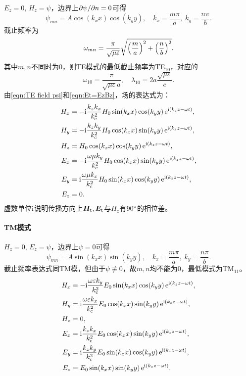 $E_z=0,\,H_z=\psi$，边界上$\partial\psi/\partial n=0$可得
\begin{equation}
    \psi_{mn}=A\cos(k_xx)\cos(k_yy),\quad k_x=\frac{m\pi}a,\;k_y=\frac{n\pi}b.
\end{equation}
截止频率为
\begin{equation}
    \omega_{mn}=\frac\pi{\sqrt{\mu\varepsilon}}\sqrt{\Bigl(\frac ma\Bigr)^2+\Bigl(\frac nb\Bigr)^2}.
\end{equation}
其中$m,n$不同时为0，则TE模式的最低截止频率为TE$_{10}$，对应的
\[
    \omega_{10}=\frac\pi{\sqrt{\mu\varepsilon}a},\quad\lambda_{10}=2a\frac{\sqrt{\mu\varepsilon}}c.
\]
由\eqref{eqn:TE field psi}和\eqref{eqn:Et=EzBz}，场的表达式为：
\begin{subequations}
    \begin{align}
        H_x&=-\mathrm{i}\frac{k_zk_x}{k_\text c^2}H_0\sin(k_xx)\cos(k_yy)\mathop{}\!\mathrm{e}^{\mathrm{i}(k_zz-\omega t)},\\
        H_y&=-\mathrm{i}\frac{k_zk_y}{k_\text c^2}H_0\cos(k_xx)\sin(k_yy)\mathop{}\!\mathrm{e}^{\mathrm{i}(k_zz-\omega t)},\\
        H_z&=H_0\cos(k_xx)\cos(k_yy)\mathop{}\!\mathrm{e}^{\mathrm{i}(k_zz-\omega t)},\\
        E_x&=-\mathrm{i}\frac{\omega\mu k_y}{k_\text c^2}H_0\cos(k_xx)\sin(k_yy)\mathop{}\!\mathrm{e}^{\mathrm{i}(k_zz-\omega t)},\\
        E_y&=\mathrm{i}\frac{\omega\mu k_x}{k_\text c^2}H_0\sin(k_xx)\cos(k_yy)\mathop{}\!\mathrm{e}^{\mathrm{i}(k_zz-\omega t)},\\
        E_z&=0.
    \end{align}
\end{subequations}
虚数单位$\mathrm{i}$说明传播方向上$\bm H_\text t,\bm E_\text t$与$H_z$有$90^\circ$的相位差。

\paragraph{TM模式}
$H_z=0,\,E_z=\psi$，边界上$\psi=0$可得
\begin{equation}
    \psi_{mn}=A\sin(k_xx)\sin(k_yy),\quad k_x=\frac{m\pi}a,\;k_y=\frac{n\pi}b.
\end{equation}
截止频率表达式同TM模，但由于$\psi\not\equiv 0$，故$m,n$均不能为0，最低模式为TM$_{11}$。
\begin{subequations}
    \begin{align}
        H_x&=-\mathrm{i}\frac{\omega\varepsilon k_y}{k_\text c^2}E_0\sin(k_xx)\cos(k_yy)\mathop{}\!\mathrm{e}^{\mathrm{i}(k_zz-\omega t)},\\
        H_y&=\mathrm{i}\frac{\omega\varepsilon k_x}{k_\text c^2}E_0\cos(k_xx)\sin(k_yy)\mathop{}\!\mathrm{e}^{\mathrm{i}(k_zz-\omega t)},\\
        H_z&=0,\\
        E_x&=\mathrm{i}\frac{k_zk_x}{k_\text c^2}E_0\cos(k_xx)\sin(k_yy)\mathop{}\!\mathrm{e}^{\mathrm{i}(k_zz-\omega t)},\\
        E_y&=\mathrm{i}\frac{k_zk_y}{k_\text c^2}E_0\sin(k_xx)\cos(k_yy)\mathop{}\!\mathrm{e}^{\mathrm{i}(k_zz-\omega t)},\\
        E_z&=E_0\sin(k_xx)\sin(k_yy)\mathop{}\!\mathrm{e}^{\mathrm{i}(k_zz-\omega t)}.
    \end{align}
\end{subequations}

